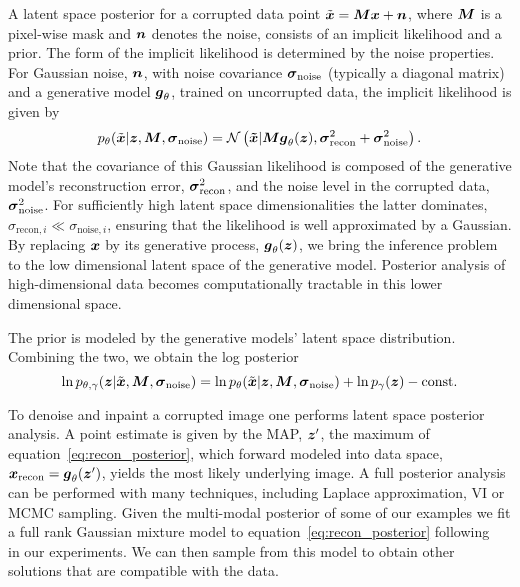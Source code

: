 \documentclass[10pt]{article} \usepackage[accepted]{tmlr}
\def\bi#1{\hbox{\boldmath{$#1$}}}
\begin{document}
A latent space posterior for a corrupted data point $\tilde{\bi{x}}=\bi M \bi x + \bi n$, where $\bi{M}$ is a pixel-wise mask and $\bi n$ denotes the noise, consists of an implicit likelihood and a prior. The form of the implicit likelihood is determined by the noise properties. For Gaussian noise, $\bi n$, with noise 
covariance $\bi{\sigma}_{\mathrm{noise}}$
(typically a diagonal matrix) and a generative model $\bi{g}_\theta$, trained on uncorrupted data, the implicit likelihood is given by
\begin{equation}
     p_{\theta}(\tilde{\bi {x}}|\bi{z},\bi{M},\bi{\sigma}_{\mathrm{noise}}) = \mathcal{N}\left(\bi{\tilde x} |\bi M \bi{g}_\theta(\bi z) , \bi{\sigma}_{\mathrm{recon}}^2+\bi{\sigma}^2_{\mathrm{noise}}\right).
     \label{eq:recon_likelihood}
\end{equation}
Note that the covariance of this Gaussian likelihood is composed of the generative model's reconstruction error, $\bi \sigma_{\mathrm{recon}}^2$, and the noise level in the corrupted data, $\bi \sigma^2_{\mathrm{noise}}$. For sufficiently high latent space dimensionalities the latter dominates, $\sigma_{\mathrm{recon},i}{\ll}\sigma_{\mathrm{noise},i}$, ensuring that the likelihood is well approximated by a Gaussian. By replacing $\bi x$ by its generative process, $ \bi{g}_\theta(\bi z)$, we bring the inference problem to the low dimensional latent space of the generative model. Posterior analysis of high-dimensional data becomes computationally tractable in this lower dimensional space.

The prior is modeled by the generative models' latent space distribution. Combining the two, we obtain the log posterior
\begin{equation}
    \ln p_{\theta,\gamma}(\bi z|\tilde{\bi{x}},\bi{M},\bi{\sigma}_{\mathrm{noise}}) = \ln p_{\theta}(\tilde{\bi {x}}|\bi{z},\bi{M},\bi{\sigma}_{\mathrm{noise}}) +\ln p_{\gamma}(\bi{z}) - \mathrm{const}.
    \label{eq:recon_posterior}
\end{equation}

To denoise and inpaint a corrupted image one performs latent space posterior analysis. A point estimate is given by the MAP, $\bi z'$, the maximum of equation~\ref{eq:recon_posterior}, which forward modeled into data space, $\bi x_\mathrm{recon}=\bi{g}_\theta(\bi z')$, yields the most likely underlying image. A full posterior analysis can be performed with many techniques, including Laplace approximation, VI or MCMC sampling. Given the multi-modal posterior of some of our examples we fit a full rank Gaussian mixture model to equation~\ref{eq:recon_posterior} following~\citep{SeljakYu19} in our experiments. We can then sample from this model to obtain other solutions that are compatible with the data. 
\end{document}
